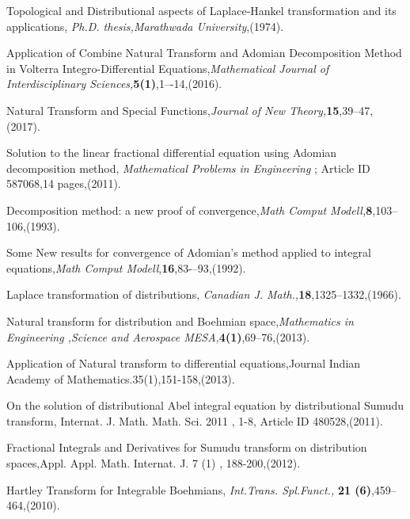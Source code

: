 \begin{thebibliography}{00}
 Topological and Distributional aspects of Laplace-Hankel transformation and its applications, {\it Ph.D. thesis,Marathwada University},(1974).

Application of Combine Natural Transform and Adomian Decomposition Method in Volterra Integro-Differential Equations,{\it Mathematical Journal of Interdisciplinary Sciences,}{\bf 5(1)},1–-14,(2016).

Natural Transform and Special Functions,{\it Journal of New Theory,}{\bf 15},39--47,(2017). 

 Solution to the linear fractional differential equation using Adomian decomposition method, {\it Mathematical Problems in Engineering} ; Article ID 587068,14 pages,(2011).

 Decomposition method: a new proof of convergence,{\it Math Comput Modell,}{\bf 8},103–106,(1993).

Some  New results for convergence of Adomian's method applied to integral equations,{\it Math
Comput Modell},{\bf16},83-–93,(1992).


 Laplace transformation of distributions, {\it Canadian J. Math.,}{\bf 18},1325--1332,(1966).

Natural transform for distribution and Boehmian space,{\it Mathematics in Engineering ,Science and Aerospace MESA,}{\bf 4(1)},69--76,(2013).

Application of Natural transform to differential equations,Journal Indian Academy of Mathematics.35(1),151-158,(2013).

On the solution of distributional Abel integral equation by distributional Sumudu transform, Internat. J. Math. Math. Sci. 2011 , 1-8, Article ID 480528,(2011).

Fractional Integrals and Derivatives for Sumudu transform on distribution spaces,Appl. Appl. Math. Internat. J. 7 (1) , 188-200,(2012).

 Hartley Transform for Integrable Boehmians, {\it Int.Trans. Spl.Funct.,} {\bf 21 (6)},459--464,(2010).



\end{thebibliography}
